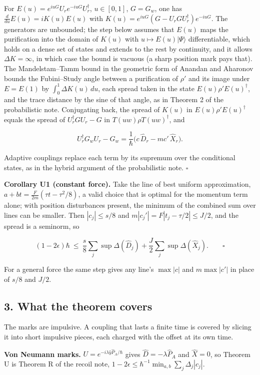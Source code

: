 \documentclass[11pt,a4paper]{article}
\begin{document}
For \(E(u)=e^{iuG}U_re^{-iuG}U_r^\dagger\), \(u\in[0,1]\), \(G=G_w\),
one has \(\frac{d}{du}E(u)=iK(u)E(u)\) with
\(K(u)=e^{iuG}(G-U_rGU_r^\dagger)e^{-iuG}\). The generators are
unbounded; the step below assumes that \(E(u)\) maps the purification
into the domain of \(K(u)\) with \(u\mapsto E(u)|\Psi\rangle\)
differentiable, which holds on a dense set of states and extends to the
rest by continuity, and it allows \(\Delta K=\infty\), in which case the
bound is vacuous (a sharp position mark pays that). The Mandelstam--Tamm
bound in the geometric form of Anandan and Aharonov bounds the
Fubini--Study angle between a purification of \(\rho'\) and its image
under \(E=E(1)\) by \(\int_0^1\Delta K(u)\,du\), each spread taken in
the state \(E(u)\rho'E(u)^\dagger\), and the trace distance by the sine
of that angle, as in Theorem 2 of the probabilistic note. Conjugating
back, the spread of \(K(u)\) in \(E(u)\rho'E(u)^\dagger\) equals the
spread of \(U_r^\dagger GU_r-G\) in \(T(uw)\rho T(uw)^\dagger\), and

\[U_r^\dagger G_wU_r-G_w=\frac1\hbar\bigl(c\,\hat D_r-mc'\,\hat X_r\bigr).\]

Adaptive couplings replace each term by its supremum over the
conditional states, as in the hybrid argument of the probabilistic note.
\(\square\)

\textbf{Corollary U1 (constant force).} Take the line of best uniform
approximation, \(a+bt=\frac F{2m}(\tau t-\tau^2/8)\), a valid choice
that is optimal for the momentum term alone; with position disturbances
present, the minimum of the combined sum over lines can be smaller. Then
\(|c_j|\le s/8\) and \(m|c_j'|=F|t_j-\tau/2|\le J/2\), and the spread is
a seminorm, so

\[(1-2\epsilon)\hbar\ \le\ \frac s8\sum_j\sup\Delta(\hat D_j)+\frac J2\sum_j\sup\Delta(\hat X_j). \qquad\square\]

For a general force the same step gives any line's \(\max|c|\) and
\(m\max|c'|\) in place of \(s/8\) and \(J/2\).

\hypertarget{what-the-theorem-covers}{%
\subsection{3. What the theorem covers}\label{what-the-theorem-covers}}

The marks are impulsive. A coupling that lasts a finite time is covered
by slicing it into short impulsive pieces, each charged with the offset
at its own time.

\textbf{Von Neumann marks.} \(U=e^{-i\lambda\hat y\hat P_A/\hbar}\)
gives \(\hat D=-\lambda\hat P_A\) and \(\hat X=0\), so Theorem U is
Theorem R of the recoil note,
\(1-2\epsilon\le\hbar^{-1}\min_{a,b}\sum_j\Delta_j|c_j|\).
\end{document}
